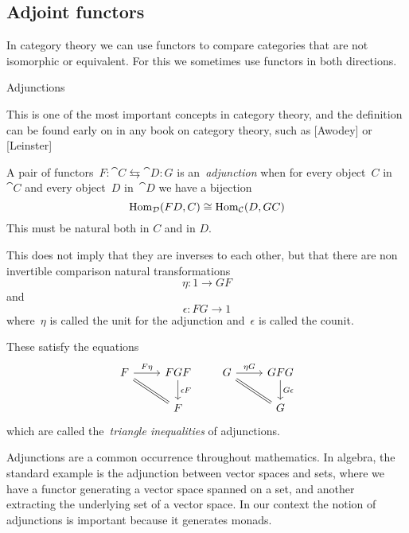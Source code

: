 \documentclass[../TFG.tex]{subfiles}
\begin{document}
\subsection{Adjoint functors}
In category theory we can use functors to compare categories that are not
isomorphic or equivalent. For this we sometimes use functors in both directions.

Adjunctions

This is one of the most important concepts in category theory, and
the definition can be found early on in any book on category theory,
such as [Awodey] or [Leinster]


\begin{definition}[Adjunction]
A pair of functors~\(F:\cat{C}\leftrightarrows\cat{D}:G\) is
an~\emph{adjunction} when for every object~\(C\) in~\(\cat{C}\) and every
object~\(D\) in~\(\cat{D}\) we have a bijection
\[
    \operatorname{Hom}_{\mathcal{D}}(FD, C) \cong \operatorname{Hom}_{\mathcal{C}}(D, GC)
\]
This must be natural both in $C$ and in $D$.
\end{definition}

This does not imply that they are inverses to each other, but that there are non
invertible comparison natural transformations
\[
    \eta:1\longrightarrow GF
\]
and
\[
    \epsilon:FG\longrightarrow 1
\]
where~\(\eta\) is called the unit for the adjunction and~\(\epsilon\) is called
the counit.

These satisfy the equations
\[
    \begin{tikzcd}
        F \arrow[r, "F\eta", rightarrow] \arrow[dr, equal] & FGF \arrow[d, "\epsilon F", rightarrow] \\
                                                           & F
    \end{tikzcd}
    \qquad
    \begin{tikzcd}
        G \arrow[r, "\eta G", rightarrow] \arrow[dr, equal] & GFG \arrow[d, "G\epsilon", rightarrow] \\
                                                            & G
    \end{tikzcd}
\]
which are called the~\emph{triangle inequalities} of adjunctions.

Adjunctions are a common occurrence throughout mathematics. In algebra, the
standard example is the adjunction between vector spaces and sets, where we have
a functor generating a vector space spanned on a set, and another extracting the
underlying set of a vector space. In our context the notion of adjunctions is
important because it generates monads.
\end{document}
